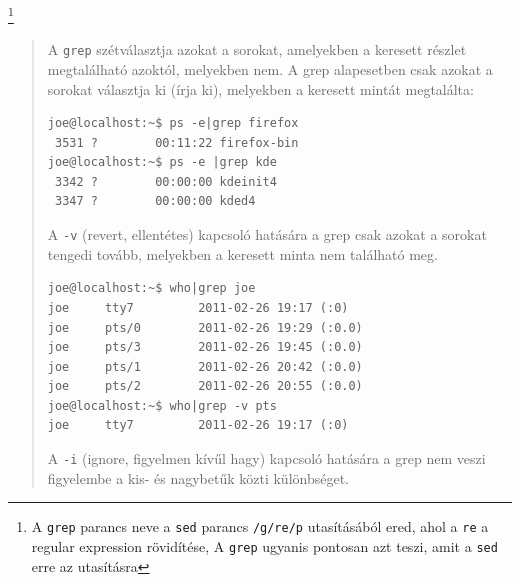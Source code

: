 \noindent{}\footnote{A \texttt{grep} parancs neve a 
  \texttt{sed} parancs \texttt{/g/re/p} utasításából ered, ahol a \texttt{re} a regular expression rövidítése, A \texttt{grep} 
  ugyanis pontosan azt teszi, amit a \texttt{sed} erre az utasításra}

\begin{quotation}
 A \verb.grep. szétválasztja azokat a sorokat, amelyekben a keresett részlet megtalálható azoktól, melyekben nem. A grep alapesetben csak azokat a sorokat választja ki 
(írja ki), melyekben a keresett mintát megtalálta:
\begin{lstlisting}
joe@localhost:~$ ps -e|grep firefox
 3531 ?        00:11:22 firefox-bin
joe@localhost:~$ ps -e |grep kde
 3342 ?        00:00:00 kdeinit4
 3347 ?        00:00:00 kded4
\end{lstlisting}

A \texttt{-v} (revert, ellentétes) kapcsoló hatására a grep  csak azokat a sorokat tengedi tovább, melyekben a keresett
minta nem található meg. 

\begin{lstlisting}
joe@localhost:~$ who|grep joe
joe     tty7         2011-02-26 19:17 (:0)
joe     pts/0        2011-02-26 19:29 (:0.0)
joe     pts/3        2011-02-26 19:45 (:0.0)
joe     pts/1        2011-02-26 20:42 (:0.0)
joe     pts/2        2011-02-26 20:55 (:0.0)
joe@localhost:~$ who|grep -v pts
joe     tty7         2011-02-26 19:17 (:0)
\end{lstlisting}
A \texttt{-i} (ignore, figyelmen kívűl hagy) kapcsoló hatására a grep nem veszi figyelembe a kis- és nagybetűk közti különbséget.

\end{quotation}


